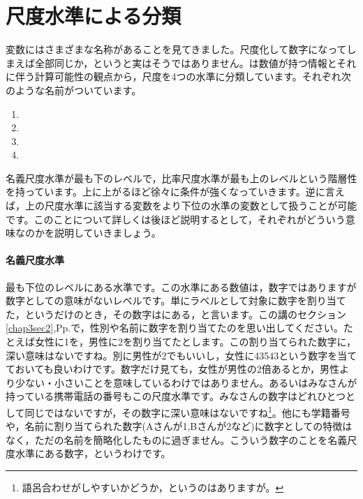 \documentclass{ltjsbook}
\begin{document}
\section{尺度水準による分類}
変数にはさまざまな名称があることを見てきました。尺度化して数字になってしまえば全部同じか，というと実はそうではありません。\textcite{stevens1946}は数値が持つ情報とそれに伴う計算可能性の観点から，尺度を4つの水準に分類しています。それぞれ次のような名前がついています。
\begin{enumerate}
	\item {}
	\item {}
	\item {}
	\item {}
\end{enumerate}

名義尺度水準が最も下のレベルで，比率尺度水準が最も上のレベルという階層性を持っています。上に上がるほど徐々に条件が強くなっていきます。逆に言えば，上の尺度水準に該当する変数をより下位の水準の変数として扱うことが可能です。このことについて詳しくは後ほど説明するとして，それぞれがどういう意味なのかを説明していきましょう。

\paragraph{名義尺度水準}
最も下位のレベルにある水準です。この水準にある数値は，数字ではありますが数字としての意味がないレベルです。単にラベルとして対象に数字を割り当てた，というだけのとき，その数字はにある，と言います。この講のセクション\ref{chap3sec2},Pp.\pageref{chap3sec2}で，性別や名前に数字を割り当てたのを思い出してください。たとえば女性に1を，男性に2を割り当てたとします。この割り当てられた数字に，深い意味はないですね。別に男性が2でもいいし，女性に43543という数字を当てておいても良いわけです。数字だけ見ても，女性が男性の2倍あるとか，男性より少ない・小さいことを意味しているわけではありません。あるいはみなさんが持っている携帯電話の番号もこの尺度水準です。みなさんの数字はどれひとつとして同じではないですが，その数字に深い意味はないですね\footnote{語呂合わせがしやすいかどうか，というのはありますが。}。他にも学籍番号や，名前に割り当てられた数字(Aさんが1,Bさんが2など)に数字としての特徴はなく，ただの名前を簡略化したものに過ぎません。こういう数字のことを名義尺度水準にある数字，というわけです。
\end{document}
